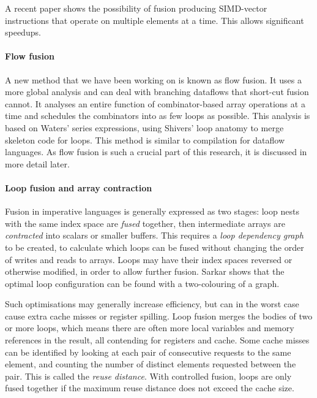 A recent paper shows the possibility of fusion producing SIMD-vector instructions\cite{bik2004software} that operate on multiple elements at a time\cite{mainland2013haskell}.
This allows significant speedups.


\paragraph{Flow fusion}

A new method that we have been working on is known as flow fusion\cite{lippmeier2013flow}.
It uses a more global analysis and can deal with branching dataflows that short-cut fusion cannot.
It analyses an entire function of combinator-based array operations at a time and schedules the combinators into as few loops as possible.
This analysis is based on Waters' series expressions\cite{waters1991automatic}, using Shivers' loop anatomy\cite{shivers2005anatomy} to merge skeleton code for loops.
This method is similar to compilation for dataflow languages\cite{johnston2004advances}.
As flow fusion is such a crucial part of this research, it is discussed in more detail later.


\paragraph{Loop fusion and array contraction}

Fusion in imperative languages is generally expressed as two stages:
loop nests with the same index space are \emph{fused} together,
then intermediate arrays are \emph{contracted} into scalars or smaller buffers.
This requires a \emph{loop dependency graph}\cite{gao1993collective} to be created,
to calculate which loops can be fused without changing the order of writes and reads to arrays.
Loops may have their index spaces reversed or otherwise modified, in order to allow further fusion.
Sarkar shows that the optimal loop configuration can be found with a two-colouring of a graph\cite{sarkar1991optimization}.

Such optimisations may generally increase efficiency, but can in the worst case cause extra cache misses or register spilling.
Loop fusion merges the bodies of two or more loops, which means there are often more local variables
and memory references in the result, all contending for registers and cache.
Some cache misses can be identified by looking at each pair of consecutive requests to the same element, and counting the number of distinct elements requested between the pair.
This is called the \emph{reuse distance}\cite{song2004improving}.
With controlled fusion, loops are only fused together if the maximum reuse distance does not exceed the cache size. 

